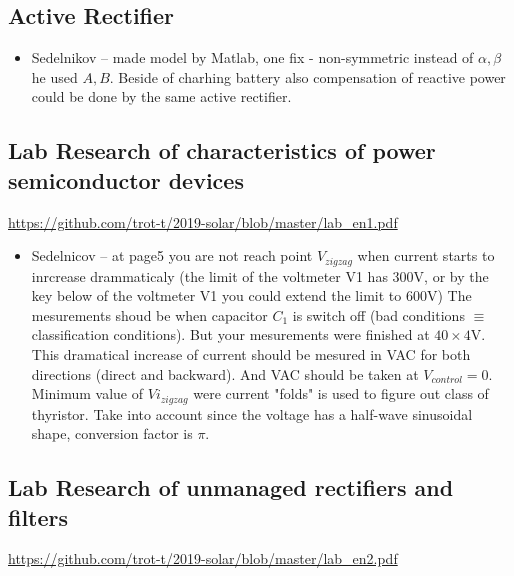\documentclass[a4paper,landscape,11pt]{article}
\begin{document}
\subsection{Active Rectifier}
\begin{itemize}
\item Sedelnikov --  made model by Matlab, one fix - non-symmetric instead of $\alpha, \beta$ he used $A,B$. Beside of charhing battery also compensation of
reactive power could be done by the same active rectifier. 
\end{itemize}

\subsection{Lab  Research of characteristics of power semiconductor devices}
\url{https://github.com/trot-t/2019-solar/blob/master/lab_en1.pdf}
\begin{itemize}
\item Sedelnicov -- at page5 you are not reach point $V_{zigzag}$ when current starts to inrcrease drammaticaly (the limit of the voltmeter V1 has 300V, or by the key below of the voltmeter V1 you could extend the limit to 600V)
The mesurements shoud be when capacitor $C_1$ is switch off (bad conditions $\equiv$ classification conditions). But your mesurements were finished at $40\times 4$V.
This dramatical increase of current should be mesured in VAC for both directions (direct and backward). And VAC should be taken at $V_{control}=0$.
Minimum value of $Vi_{zigzag}$ were current "folds" is used to figure out class of thyristor. 
Take into account since the voltage has a half-wave sinusoidal shape, conversion factor is $\pi$.
\end{itemize}


\subsection{Lab  Research of unmanaged rectifiers and filters}
\url{https://github.com/trot-t/2019-solar/blob/master/lab_en2.pdf}
\end{document}
